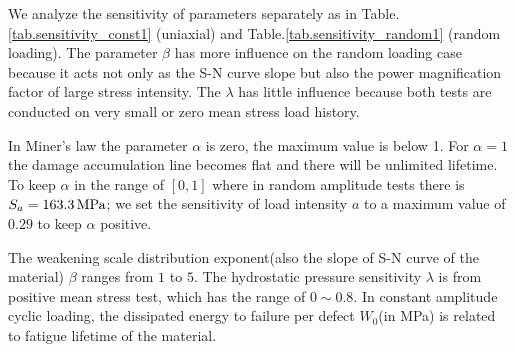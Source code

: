 We analyze the sensitivity of parameters separately as in Table.\ref{tab.sensitivity_const1} (uniaxial) and Table.\ref{tab.sensitivity_random1} (random loading). The parameter $\beta$ has more influence on the random loading case because it acts not only as the S-N curve slope but also the power magnification factor of large stress intensity. The $\lambda$ has little influence because both tests are conducted on very small or zero mean stress load history.


In Miner's law the parameter $\alpha$ is zero, the maximum value is below 1. For $\alpha=1$ the damage accumulation line becomes flat and there will be unlimited lifetime. To keep $\alpha$ in the range of $[0,1]$ where in random amplitude tests there is $S_{a}=163.3\,\textnormal{MPa}$; we set the sensitivity of load intensity  $a$  to a maximum value of $0.29$ to keep $\alpha$ positive. 

The weakening scale distribution exponent(also the slope of S-N curve of the material) $\beta$ ranges from $1$ to $5$. The hydrostatic pressure sensitivity $\lambda$ is from positive mean stress test, which has the range of $0\sim0.8$. In constant amplitude cyclic loading, the dissipated energy to failure per defect $W_0$(in MPa) is related to fatigue lifetime of the material.

